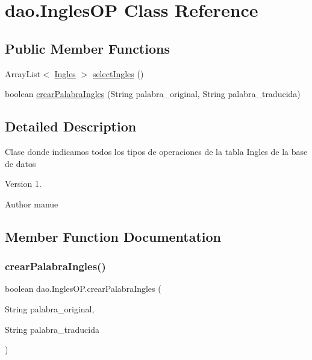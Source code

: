 \hypertarget{classdao_1_1_ingles_o_p}{}\section{dao.\+Ingles\+OP Class Reference}
\label{classdao_1_1_ingles_o_p}
\subsection*{Public Member Functions}
\begin{DoxyCompactItemize}
\item 
Array\+List$<$ \mbox{\hyperlink{classvo_1_1_ingles}{Ingles}} $>$ \mbox{\hyperlink{classdao_1_1_ingles_o_p_a2ca6d784eb05b7ef5dfbbe9778778aaa}{select\+Ingles}} ()
\item 
boolean \mbox{\hyperlink{classdao_1_1_ingles_o_p_abeb9b4d0a23ed1723406892aacea5bbe}{crear\+Palabra\+Ingles}} (String palabra\+\_\+original, String palabra\+\_\+traducida)
\end{DoxyCompactItemize}


\subsection{Detailed Description}
Clase donde indicamos todos los tipos de operaciones de la tabla Ingles de la base de datos \begin{DoxyVersion}{Version}
1. 
\end{DoxyVersion}
\begin{DoxyAuthor}{Author}
manue 
\end{DoxyAuthor}


\subsection{Member Function Documentation}
\mbox{\label{classdao_1_1_ingles_o_p_abeb9b4d0a23ed1723406892aacea5bbe}} 
\subsubsection{\texorpdfstring{crearPalabraIngles()}{crearPalabraIngles()}}
{\footnotesize\ttfamily boolean dao.\+Ingles\+O\+P.\+crear\+Palabra\+Ingles (\begin{DoxyParamCaption}\item[{String}]{palabra\+\_\+original,  }\item[{String}]{palabra\+\_\+traducida }\end{DoxyParamCaption})\hspace{0.3cm}{\ttfamily [inline]}}

